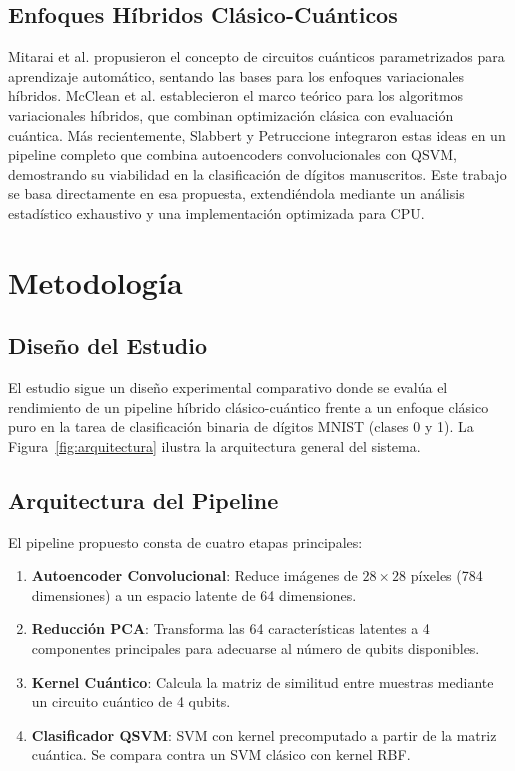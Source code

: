 \documentclass[conference]{IEEEtran}
\begin{document}
\subsection{Enfoques Híbridos Clásico-Cuánticos}

Mitarai et al. \cite{mitarai2018quantum} propusieron el concepto de circuitos 
cuánticos parametrizados para aprendizaje automático, sentando las bases para 
los enfoques variacionales híbridos. McClean et al. \cite{mcclean2016theory} 
establecieron el marco teórico para los algoritmos variacionales híbridos, que 
combinan optimización clásica con evaluación cuántica. Más recientemente, 
Slabbert y Petruccione \cite{slabbert2024hybrid} integraron estas ideas en un 
pipeline completo que combina autoencoders convolucionales con QSVM, demostrando 
su viabilidad en la clasificación de dígitos manuscritos. Este trabajo se basa 
directamente en esa propuesta, extendiéndola mediante un análisis estadístico 
exhaustivo y una implementación optimizada para CPU.

\section{Metodología}
\label{sec:metodologia}

\subsection{Diseño del Estudio}

El estudio sigue un diseño experimental comparativo donde se evalúa el 
rendimiento de un pipeline híbrido clásico-cuántico frente a un enfoque clásico 
puro en la tarea de clasificación binaria de dígitos MNIST (clases 0 y 1). 
La Figura~\ref{fig:arquitectura} ilustra la arquitectura general del sistema.

\subsection{Arquitectura del Pipeline}

El pipeline propuesto consta de cuatro etapas principales:

\begin{enumerate}
    \item \textbf{Autoencoder Convolucional}: Reduce imágenes de $28 \times 28$ 
          píxeles (784 dimensiones) a un espacio latente de 64 dimensiones.
    \item \textbf{Reducción PCA}: Transforma las 64 características latentes a 
          4 componentes principales para adecuarse al número de qubits disponibles.
    \item \textbf{Kernel Cuántico}: Calcula la matriz de similitud entre muestras 
          mediante un circuito cuántico de 4 qubits.
    \item \textbf{Clasificador QSVM}: SVM con kernel precomputado a partir de la 
          matriz cuántica. Se compara contra un SVM clásico con kernel RBF.
\end{enumerate}
\end{document}
